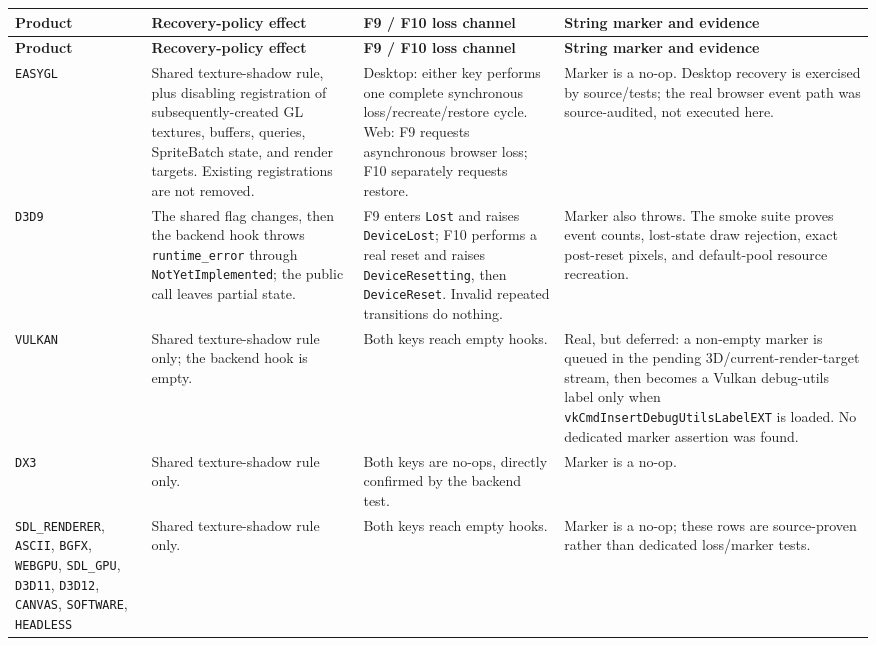 \begingroup
\footnotesize
\setlength{\tabcolsep}{3pt}
\renewcommand{\arraystretch}{1.13}
\begin{longtable}{@{}p{}p{}p{}p{}@{}}
\toprule
\textbf{Product} & \textbf{Recovery-policy effect} &
\textbf{F9 / F10 loss channel} & \textbf{String marker and evidence} \\
\midrule
\endfirsthead
\toprule
\textbf{Product} & \textbf{Recovery-policy effect} &
\textbf{F9 / F10 loss channel} & \textbf{String marker and evidence} \\
\midrule
\endhead
\texttt{EASYGL}
  & Shared texture-shadow rule, plus disabling registration of subsequently-created GL
    textures, buffers, queries, SpriteBatch state, and render targets. Existing registrations
    are not removed.
  & Desktop: either key performs one complete synchronous loss/recreate/restore cycle.
    Web: F9 requests asynchronous browser loss; F10 separately requests restore.
  & Marker is a no-op. Desktop recovery is exercised by source/tests; the real browser event
    path was source-audited, not executed here. \\
\texttt{D3D9}
  & The shared flag changes, then the backend hook throws
    \texttt{runtime\_error} through \texttt{NotYetImplemented}; the public call leaves partial
    state.
  & F9 enters \texttt{Lost} and raises \texttt{DeviceLost}; F10 performs a real reset and
    raises \texttt{DeviceResetting}, then \texttt{DeviceReset}. Invalid repeated transitions
    do nothing.
  & Marker also throws. The smoke suite proves event counts, lost-state draw rejection,
    exact post-reset pixels, and default-pool resource recreation. \\
\texttt{VULKAN}
  & Shared texture-shadow rule only; the backend hook is empty.
  & Both keys reach empty hooks.
  & Real, but deferred: a non-empty marker is queued in the pending 3D/current-render-target
    stream, then becomes a Vulkan debug-utils label only when
    \texttt{vkCmdInsert\allowbreak{}DebugUtils\allowbreak{}LabelEXT} is loaded. No dedicated
    marker assertion was found. \\
\texttt{DX3}
  & Shared texture-shadow rule only.
  & Both keys are no-ops, directly confirmed by the backend test.
  & Marker is a no-op. \\
\texttt{SDL\_\allowbreak{}RENDERER}, \texttt{ASCII}, \texttt{BGFX}, \texttt{WEBGPU},
\texttt{SDL\_GPU}, \texttt{D3D11}, \texttt{D3D12}, \texttt{CANVAS},
\texttt{SOFTWARE}, \texttt{HEADLESS}
  & Shared texture-shadow rule only.
  & Both keys reach empty hooks.
  & Marker is a no-op; these rows are source-proven rather than dedicated loss/marker tests. \\
\bottomrule
\end{longtable}
\endgroup

